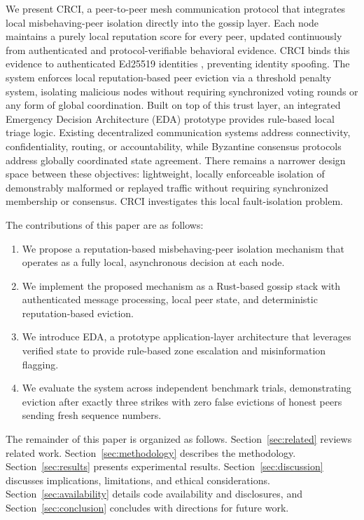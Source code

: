 \documentclass[conference]{IEEEtran}
\begin{document}
We present CRCI, a peer-to-peer mesh communication protocol that integrates local misbehaving-peer isolation directly into the gossip layer. Each node maintains a purely local reputation score for every peer, updated continuously from authenticated and protocol-verifiable behavioral evidence. CRCI binds this evidence to authenticated Ed25519 identities \cite{bernstein2012ed25519}, preventing identity spoofing. The system enforces local reputation-based peer eviction via a threshold penalty system, isolating malicious nodes without requiring synchronized voting rounds or any form of global coordination. Built on top of this trust layer, an integrated Emergency Decision Architecture (EDA) prototype provides rule-based local triage logic. Existing decentralized communication systems address connectivity, confidentiality, routing, or accountability, while Byzantine consensus protocols address globally coordinated state agreement. There remains a narrower design space between these objectives: lightweight, locally enforceable isolation of demonstrably malformed or replayed traffic without requiring synchronized membership or consensus. CRCI investigates this local fault-isolation problem.

The contributions of this paper are as follows:
\begin{enumerate}
    \item We propose a reputation-based misbehaving-peer isolation mechanism that operates as a fully local, asynchronous decision at each node.
    \item We implement the proposed mechanism as a Rust-based gossip stack with authenticated message processing, local peer state, and deterministic reputation-based eviction.
    \item We introduce EDA, a prototype application-layer architecture that leverages verified state to provide rule-based zone escalation and misinformation flagging.
    \item We evaluate the system across independent benchmark trials, demonstrating eviction after exactly three strikes with zero false evictions of honest peers sending fresh sequence numbers.
\end{enumerate}

The remainder of this paper is organized as follows. Section~\ref{sec:related} reviews related work. Section~\ref{sec:methodology} describes the methodology. Section~\ref{sec:results} presents experimental results. Section~\ref{sec:discussion} discusses implications, limitations, and ethical considerations. Section~\ref{sec:availability} details code availability and disclosures, and Section~\ref{sec:conclusion} concludes with directions for future work.
\end{document}
